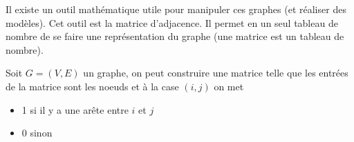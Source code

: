 \documentclass[12pt,fleqn]{article} %
\begin{document}
Il existe un outil mathématique utile pour manipuler ces graphes (et réaliser des modèles). Cet outil est la matrice d'adjacence. Il permet en un seul tableau de nombre de se faire une représentation du graphe (une matrice est un tableau de nombre).
\begin{definition}
	Soit $G = (V,E)$ un graphe, on peut construire une matrice telle que les entrées de la matrice sont les noeuds et à la case $(i,j)$ on met \begin{itemize}
		\item 1 si il y a une arête entre $i$ et $j$
		\item 0 sinon
	\end{itemize}
\end{definition}
\end{document}
